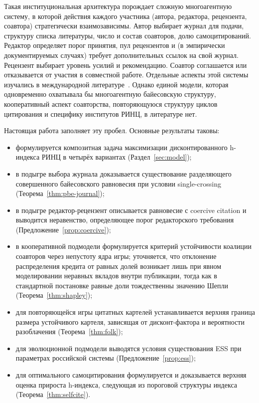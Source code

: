 \documentclass[12pt,a4paper]{article}
\theoremstyle{definition}
\begin{document}
Такая институциональная архитектура порождает сложную многоагентную
систему, в которой действия каждого участника (автора, редактора,
рецензента, соавтора) стратегически взаимозависимы. Автор выбирает
журнал для подачи, структуру списка литературы, число и состав
соавторов, долю самоцитирований. Редактор определяет порог принятия,
пул рецензентов и (в эмпирически документируемых случаях) требует
дополнительных ссылок на свой журнал. Рецензент выбирает уровень
усилий и рекомендацию. Соавтор соглашается или отказывается от
участия в совместной работе. Отдельные аспекты этой системы изучались
в международной литературе~\citep{garcia2015authored,
  heintzelman2009, bartneck2011, smaldino2016, wilhite2012, foster2015,
ioannidis2019}. Однако единой модели, которая одновременно охватывала
бы многоагентную байесовскую структуру, кооперативный аспект
соавторства, повторяющуюся структуру циклов цитирования и специфику
институтов РИНЦ, в литературе нет.

Настоящая работа заполняет эту пробел. Основные результаты таковы:
\begin{itemize}
  \item формулируется композитная задача максимизации
    дисконтированного h-индекса РИНЦ в четырёх вариантах
    (Раздел~\ref{sec:model});
  \item в подыгре выбора журнала доказывается существование
    разделяющего совершенного байесовского равновесия при условии
    single-crossing (Теорема~\ref{thm:pbe-journal});
  \item в подыгре редактор-рецензент описывается равновесие с
    coercive citation и выводится неравенство, определяющее порог
    редакторского требования (Предложение~\ref{prop:coercive});
  \item в кооперативной подмодели формулируется критерий устойчивости
    коалиции соавторов через непустоту ядра игры; уточняется, что
    отклонение распределения кредита от равных долей возникает лишь
    при явном моделировании неравных вкладов внутри публикации, тогда
    как в стандартной постановке равные доли тождественны значению
    Шепли~\citep{karpov2014} (Теорема~\ref{thm:shapley});
  \item для повторяющейся игры цитатных картелей устанавливается
    верхняя граница размера устойчивого картеля, зависящая от
    дисконт-фактора и вероятности разоблачения (Теорема~\ref{thm:folk});
  \item для эволюционной подмодели выводятся условия существования
    ESS при параметрах российской системы (Предложение~\ref{prop:ess});
  \item для оптимального самоцитирования формулируется и доказывается
    верхняя оценка прироста h-индекса, следующая из пороговой
    структуры индекса (Теорема~\ref{thm:selfcite}).
\end{itemize}
\end{document}
